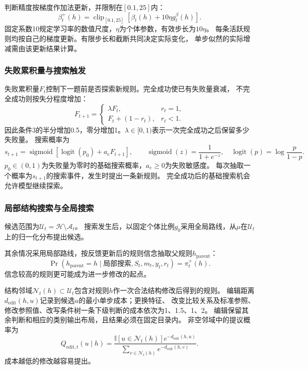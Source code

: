 \documentclass[11pt,a4paper]{article}
\numberwithin{equation}{section}
\newcommand{\ind}{\mathbb{I}}
\newcommand{\clip}{\operatorname{clip}}
\newcommand{\logit}{\operatorname{logit}}
\newcommand{\sigmoid}{\operatorname{sigmoid}}
\newcommand{\A}{\mathcal{A}}
\newcommand{\Hh}{\mathcal{H}}
\begin{document}
判断精度按梯度作加法更新，并限制在$[0.1,25]$内：
\begin{equation}
\beta_t^+(h)=\clip_{[0.1,25]}\left[\beta_t(h)+10\eta g_t^\beta(h)\right].
\label{eq:beta}
\end{equation}
固定系数10规定学习率的数值尺度，$\eta$为个体参数，有效步长为$10\eta$。
每条活跃规则均按自己的梯度更新。有限步长和截断共同决定实际变化，
单步似然的实际增减需由该更新结果计算。

\subsubsection{失败累积量与搜索触发}
失败累积量$F_t$控制下一题前是否探索新规则。完全成功使已有失败量衰减，
不完全成功则按失分程度增加：
\begin{equation}
F_{t+1}=\begin{cases}\lambda F_t,&r_t=1,\\F_t+(1-r_t),&r_t<1.\end{cases}
\label{eq:failure}
\end{equation}
因此条件3的半分增加0.5，零分增加1。$\lambda\in[0,1)$表示一次完全成功之后保留多少失败量。
搜索概率为
\begin{equation}
s_{t+1}=\sigmoid\!\left[\logit(p_0)+a_eF_{t+1}\right],\qquad
\sigmoid(z)=\frac1{1+e^{-z}},\quad\logit(p)=\log\frac{p}{1-p}.
\label{eq:search}
\end{equation}
$p_0\in(0,1)$为失败量为零时的基础搜索概率，$a_e\geq0$为失败敏感度。
每次抽取一个概率为$s_{t+1}$的搜索事件，发生时提出一条新规则。
完全成功后的基础搜索机会允许模型继续探索。

\subsubsection{局部结构搜索与全局搜索}
\label{sec:proposal}
候选范围为$\mathcal U_t=\Hh\setminus\A_t$。
搜索发生后，以固定个体比例$g_0$采用全局路线，从$\mu$在$\mathcal U_t$上的归一化分布提出候选。

其余情况采用局部路线，按反馈更新后的规则信念抽取父规则$h_{\mathrm{parent}}$：
\begin{equation}
\Pr(h_{\mathrm{parent}}=h\mid\text{局部搜索},S_t,m_t,y_t,r_t)=\pi_t^+(h).
\label{eq:parent}
\end{equation}
信念较高的规则更可能成为进一步修改的起点。

结构邻域$\mathcal N_t(h)\subset\mathcal U_t$包含对规则$h$作一次合法结构修改后得到的规则。
编辑距离$d_{\mathrm{edit}}(h,u)$记录到候选$u$的最小单步成本；更换特征、
改变比较关系及标准参照、修改参照值、改写条件树一条下级判断的成本依次为1、1.5、1、2。
编辑保留其余判断和相应的类别输出布局，且结果必须在固定目录内。
非空邻域中的提议概率为
\begin{equation}
Q_{\mathrm{edit},t}(u\mid h)=
\frac{\ind[u\in\mathcal N_t(h)]e^{-d_{\mathrm{edit}}(h,u)}}
{\sum_{v\in\mathcal N_t(h)}e^{-d_{\mathrm{edit}}(h,v)}}.
\end{equation}
成本越低的修改越容易提出。
\end{document}
